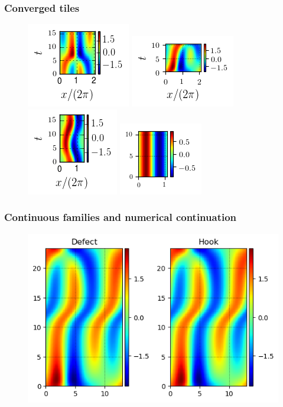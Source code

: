 \documentclass[mathserif, handout]{beamer}
\begin{document}
\begin{frame}%
  \frametitle{Converged tiles}
  \begin{figure}
  \includegraphics[width=.2\textwidth]{MNG_defect_final}
  \includegraphics[width=.2\textwidth]{MNG_hook_final}
  \includegraphics[width=.2\textwidth]{MNG_gap_final}
  \includegraphics[width=.2\textwidth]{MNG_streak_final}
  \end{figure}
\end{frame}

\begin{frame}%
  \frametitle{Continuous families and numerical continuation}
  \begin{figure}
  \includegraphics[width=.4\textwidth]{MNG_hookdefect_comparison}
  \end{figure}
\end{frame}
\end{document}
